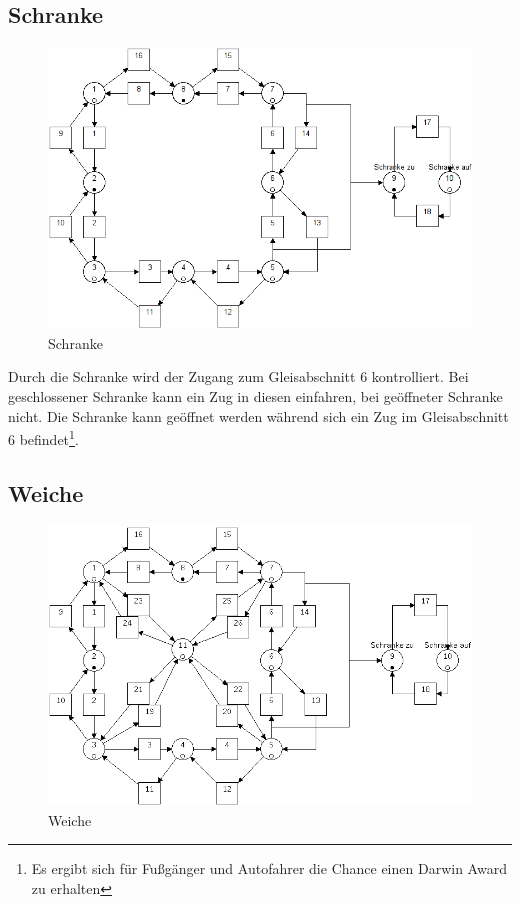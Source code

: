 \documentclass[10pt]{scrartcl}
\begin{document}
	\subsection{Schranke}	
		\begin{figure}[H]
			\includegraphics[width=\textwidth]{aufgabe21.png}
        	\caption{Schranke}
        	\label{img:aufg2}
		\end{figure}
	Durch die Schranke wird der Zugang zum Gleisabschnitt 6 kontrolliert. Bei geschlossener Schranke kann ein Zug in diesen einfahren, bei geöffneter Schranke nicht. Die Schranke kann geöffnet werden während sich ein Zug im Gleisabschnitt 6 befindet\footnote{Es ergibt sich für Fußgänger und Autofahrer die Chance einen Darwin Award zu erhalten}.

\subsection{Weiche}	
	\begin{figure}[H]
		\includegraphics[width=\textwidth]{aufgabe22.png}
       	\caption{Weiche}
       	\label{img:aufg2}
	\end{figure}
\end{document}
